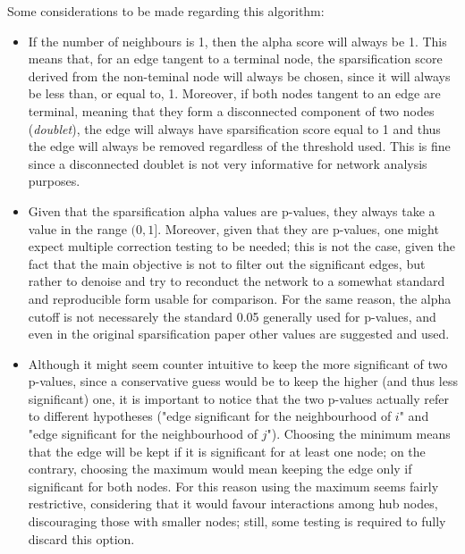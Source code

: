 Some considerations to be made regarding this algorithm: 
\begin{itemize}\tightlist
  \item If the number of neighbours is 1, then the alpha score will always be 1. This means that, for an edge tangent to a terminal node, the sparsification score derived from the non-teminal node will always be chosen, since it will always be less than, or equal to, 1. Moreover, if both nodes tangent to an edge are terminal, meaning that they form a disconnected component of two nodes (\emph{doublet}), the edge will always have sparsification score equal to 1 and thus the edge will always be removed regardless of the threshold used. This is fine since a disconnected doublet is not very informative for network analysis purposes.
  \item Given that the sparsification alpha values are p-values, they always take a value in the range $(0,1]$. Moreover, given that they are p-values, one might expect multiple correction testing to be needed; this is not the case, given the fact that the main objective is not to filter out the significant edges, but rather to denoise and try to reconduct the network to a somewhat standard and reproducible form usable for comparison. For the same reason, the alpha cutoff is not necessarely the standard 0.05 generally used for p-values, and even in the original sparsification paper other values are suggested and used.
  \item Although it might seem counter intuitive to keep the more significant of two p-values, since a conservative guess would be to keep the higher (and thus less significant) one, it is important to notice that the two p-values actually refer to different hypotheses ("edge significant for the neighbourhood of $i$" and "edge significant for the neighbourhood of $j$"). Choosing the minimum means that the edge will be kept if it is significant for at least one node; on the contrary, choosing the maximum would mean keeping the edge only if significant for both nodes. For this reason using the maximum seems fairly restrictive, considering that it would favour interactions among hub nodes, discouraging those with smaller nodes; still, some testing is required to fully discard this option.
\end{itemize}

